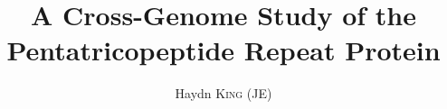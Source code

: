 \documentclass[11pt,a4paper, wide, twoside]{IIBproject}
\begin{document}



\author{Haydn \textsc{King} (JE)}
\title{A Cross-Genome Study of the Pentatricopeptide Repeat Protein}
\maketitle

\setcounter{page}{1}


\clearpage %


\setcounter{tocdepth}{1}
\tableofcontents %

\clearpage %


\pagestyle{mainstyle}



 

 
 
% 
% 

\end{document}
